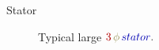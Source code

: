 \documentclass{beamer}
\begin{document}
\begin{frame}{Stator}
        \begin{figure}
        \centering
        \caption{Typical large $\textcolor{red!70!black}{3} \, \textcolor{yellow!50!black}{\phi} \, \textcolor{blue!70!black}{stator}.$}
    \end{figure}
\end{frame}
\end{document}
